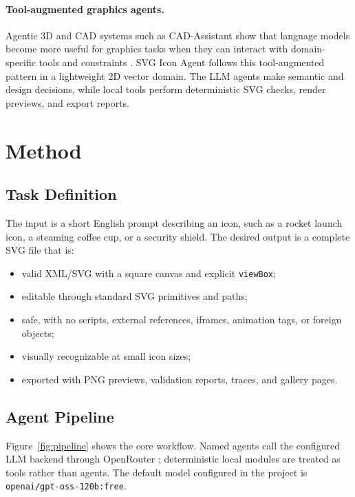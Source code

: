 \documentclass[10pt]{article}
\newcommand{\project}{SVG Icon Agent}
\begin{document}
\paragraph{Tool-augmented graphics agents.}
Agentic 3D and CAD systems such as CAD-Assistant show that language models become more useful for graphics tasks when they can interact with domain-specific tools and constraints \citep{cadassistant2025}.
\project{} follows this tool-augmented pattern in a lightweight 2D vector domain.
The LLM agents make semantic and design decisions, while local tools perform deterministic SVG checks, render previews, and export reports.

\section{Method}

\subsection{Task Definition}

The input is a short English prompt describing an icon, such as a rocket launch icon, a steaming coffee cup, or a security shield.
The desired output is a complete SVG file that is:
\begin{itemize}[leftmargin=1.5em,itemsep=0.2em]
  \item valid XML/SVG with a square canvas and explicit \texttt{viewBox};
  \item editable through standard SVG primitives and paths;
  \item safe, with no scripts, external references, iframes, animation tags, or foreign objects;
  \item visually recognizable at small icon sizes;
  \item exported with PNG previews, validation reports, traces, and gallery pages.
\end{itemize}

\subsection{Agent Pipeline}

Figure~\ref{fig:pipeline} shows the core workflow.
Named agents call the configured LLM backend through OpenRouter \citep{openrouter}; deterministic local modules are treated as tools rather than agents.
The default model configured in the project is \texttt{openai/gpt-oss-120b:free}.
\end{document}
